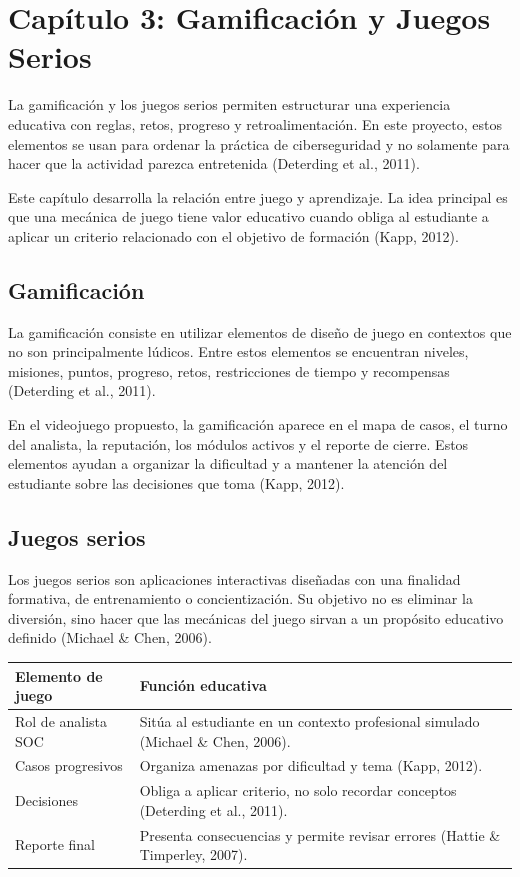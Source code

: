 \section[Capítulo 3: Gamificación y Juegos Serios]{\centering Capítulo 3: Gamificación y Juegos Serios}

La gamificación y los juegos serios permiten estructurar una experiencia educativa con reglas, retos, progreso y retroalimentación. En este proyecto, estos elementos se usan para ordenar la práctica de ciberseguridad y no solamente para hacer que la actividad parezca entretenida (Deterding et al., 2011).

Este capítulo desarrolla la relación entre juego y aprendizaje. La idea principal es que una mecánica de juego tiene valor educativo cuando obliga al estudiante a aplicar un criterio relacionado con el objetivo de formación (Kapp, 2012).

\subsection{Gamificación}

La gamificación consiste en utilizar elementos de diseño de juego en contextos que no son principalmente lúdicos. Entre estos elementos se encuentran niveles, misiones, puntos, progreso, retos, restricciones de tiempo y recompensas (Deterding et al., 2011).

En el videojuego propuesto, la gamificación aparece en el mapa de casos, el turno del analista, la reputación, los módulos activos y el reporte de cierre. Estos elementos ayudan a organizar la dificultad y a mantener la atención del estudiante sobre las decisiones que toma (Kapp, 2012).

\subsection{Juegos serios}

Los juegos serios son aplicaciones interactivas diseñadas con una finalidad formativa, de entrenamiento o concientización. Su objetivo no es eliminar la diversión, sino hacer que las mecánicas del juego sirvan a un propósito educativo definido (Michael \& Chen, 2006).

\begin{longtable}{|p{}|p{}|}
\hline
\textbf{Elemento de juego} & \textbf{Función educativa} \\
\hline
Rol de analista SOC & Sitúa al estudiante en un contexto profesional simulado (Michael \& Chen, 2006). \\
\hline
Casos progresivos & Organiza amenazas por dificultad y tema (Kapp, 2012). \\
\hline
Decisiones & Obliga a aplicar criterio, no solo recordar conceptos (Deterding et al., 2011). \\
\hline
Reporte final & Presenta consecuencias y permite revisar errores (Hattie \& Timperley, 2007). \\
\hline
\end{longtable}

